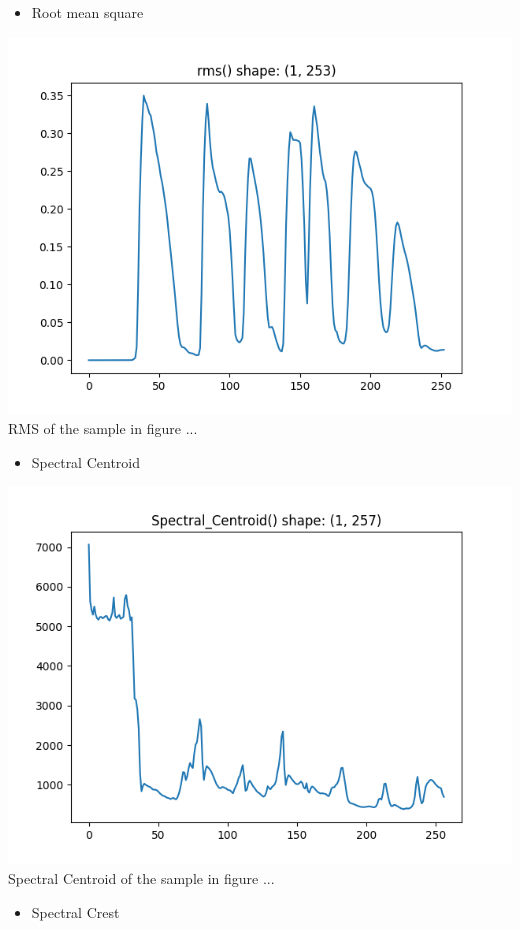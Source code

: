 \documentclass[11pt]{article}
\begin{document}
\begin{itemize}
\item Root mean square
\end{itemize}
\begin{center}
\includegraphics[width=.9\linewidth]{./Figures/rms.png}
RMS of the sample in figure ...
\end{center}
\begin{itemize}
\item Spectral Centroid
\end{itemize}
\begin{center}
\includegraphics[width=.9\linewidth]{./Figures/Spectral_Centroid.png}
Spectral Centroid of the sample in figure ...
\end{center}
\begin{itemize}
\item Spectral Crest
\end{itemize}
\end{document}
